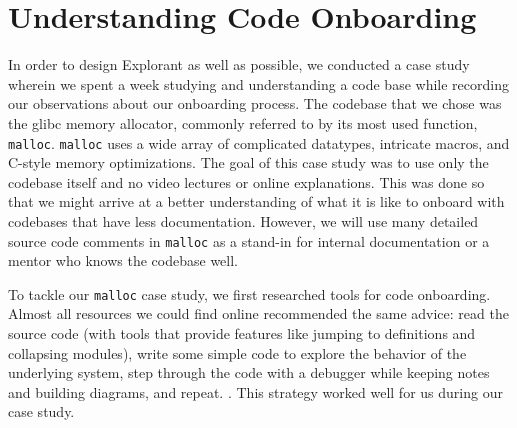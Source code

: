\chapter{Understanding Code Onboarding}


In order to design Explorant as well as possible, we conducted a case study wherein we spent a week studying and understanding a code base while recording our observations about our onboarding process. The codebase that we chose was the glibc \cite{glibc} memory allocator, commonly referred to by its most used function, \texttt{malloc}. \texttt{malloc} uses a wide array of complicated datatypes, intricate macros, and C-style memory optimizations. The goal of this case study was to use only the codebase itself and no video lectures or online explanations. This was done so that we might arrive at a better understanding of what it is like to onboard with codebases that have less documentation. However, we will use many detailed source code comments in \texttt{malloc} as a stand-in for internal documentation or a mentor who knows the codebase well. 



To tackle our \texttt{malloc} case study, we first researched tools for code onboarding. Almost all resources we could find online recommended the same advice: read the source code (with tools that provide features like jumping to definitions and collapsing modules), write some simple code to explore the behavior of the underlying system, step through the code with a debugger while keeping notes and building diagrams, and repeat. \cite{onboarding-case-study, onboarding-ramp}. This strategy worked well for us during our case study. 

